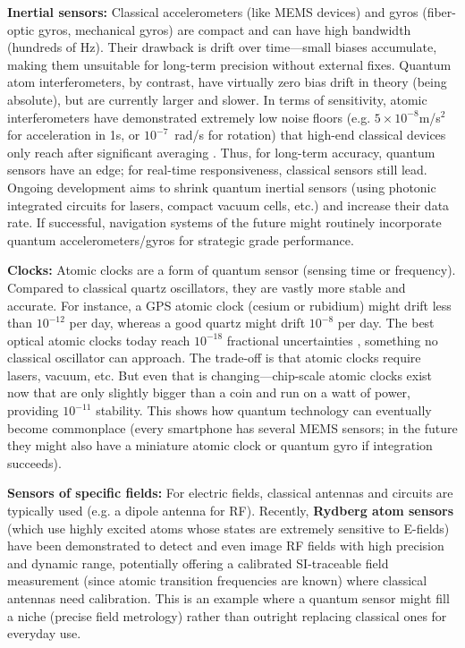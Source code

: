 \textbf{Inertial sensors:} Classical accelerometers (like MEMS
devices) and gyros (fiber-optic gyros, mechanical gyros) are compact
and can have high bandwidth (hundreds of Hz). Their drawback is drift
over time—small biases accumulate, making them unsuitable for
long-term precision without external fixes. Quantum atom
interferometers, by contrast, have virtually zero bias drift in theory
(being absolute), but are currently larger and slower. In terms of
sensitivity, atomic interferometers have demonstrated extremely low
noise floors (e.g. $5\times10^{-8}$m/s$^2$ for acceleration in 1s, or
$10^{-7}$~rad/s for rotation) that high-end classical devices only
reach after significant averaging . Thus, for long-term accuracy,
quantum sensors have an edge; for real-time responsiveness, classical
sensors still lead. Ongoing development aims to shrink quantum
inertial sensors (using photonic integrated circuits for lasers,
compact vacuum cells, etc.) and increase their data rate. If
successful, navigation systems of the future might routinely
incorporate quantum accelerometers/gyros for strategic grade
performance.



\textbf{Clocks:} Atomic clocks are a form of quantum sensor (sensing
time or frequency). Compared to classical quartz oscillators, they are
vastly more stable and accurate. For instance, a GPS atomic clock
(cesium or rubidium) might drift less than $10^{-12}$ per day, whereas
a good quartz might drift $10^{-8}$ per day. The best optical atomic
clocks today reach $10^{-18}$ fractional uncertainties , something no
classical oscillator can approach. The trade-off is that atomic clocks
require lasers, vacuum, etc. But even that is changing—chip-scale
atomic clocks exist now that are only slightly bigger than a coin and
run on a watt of power, providing $10^{-11}$ stability. This shows how
quantum technology can eventually become commonplace (every smartphone
has several MEMS sensors; in the future they might also have a
miniature atomic clock or quantum gyro if integration succeeds).



\textbf{Sensors of specific fields:} For electric fields, classical
antennas and circuits are typically used (e.g. a dipole antenna for
RF). Recently, \textbf{Rydberg atom sensors} (which use highly excited
atoms whose states are extremely sensitive to E-fields) have been
demonstrated to detect and even image RF fields with high precision
and dynamic range, potentially offering a calibrated SI-traceable
field measurement (since atomic transition frequencies are known)
where classical antennas need calibration. This is an example where a
quantum sensor might fill a niche (precise field metrology) rather
than outright replacing classical ones for everyday use.



